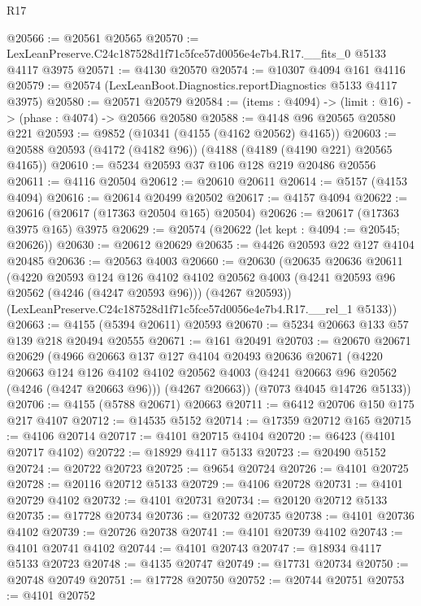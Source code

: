 \begin{lexlean}{R17}
\begin{coremodule}
@20566 := @20561 @20565
@20570 := LexLeanPreserve.C24c187528d1f71c5fce57d0056e4e7b4.R17.__fits_0 @5133 @4117 @3975
@20571 := @4130 @20570
@20574 := @10307 @4094 @161 @4116
@20579 := @20574 (LexLeanBoot.Diagnostics.reportDiagnostics @5133 @4117 @3975)
@20580 := @20571 @20579
@20584 := (items : @4094) -> (limit : @16) -> (phase : @4074) -> @20566 @20580
@20588 := @4148 @96 @20565 @20580 @221
@20593 := @9852 (@10341 (@4155 (@4162 @20562) @4165))
@20603 := @20588 @20593 (@4172 (@4182 @96)) (@4188 (@4189 (@4190 @221) @20565 @4165))
@20610 := @5234 @20593 @37 @106 @128 @219 @20486 @20556
@20611 := @4116 @20504
@20612 := @20610 @20611
@20614 := @5157 (@4153 @4094)
@20616 := @20614 @20499 @20502
@20617 := @4157 @4094
@20622 := @20616 (@20617 (@17363 @20504 @165) @20504)
@20626 := @20617 (@17363 @3975 @165) @3975
@20629 := @20574 (@20622 (let kept : @4094 := @20545; @20626))
@20630 := @20612 @20629
@20635 := @4426 @20593 @22 @127 @4104 @20485
@20636 := @20563 @4003
@20660 := @20630
    (@20635
      @20636
      @20611
      (@4220
        @20593
        @124
        @126
        @4102
        @4102
        @20562
        @4003
        (@4241 @20593 @96 @20562 (@4246 (@4247 @20593 @96)))
        (@4267 @20593))
      (LexLeanPreserve.C24c187528d1f71c5fce57d0056e4e7b4.R17.__rel_1 @5133))
@20663 := @4155 (@5394 @20611) @20593
@20670 := @5234 @20663 @133 @57 @139 @218 @20494 @20555
@20671 := @161 @20491
@20703 := @20670
    @20671
    @20629
    (@4966
      @20663
      @137
      @127
      @4104
      @20493
      @20636
      @20671
      (@4220
        @20663
        @124
        @126
        @4102
        @4102
        @20562
        @4003
        (@4241 @20663 @96 @20562 (@4246 (@4247 @20663 @96)))
        (@4267 @20663))
      (@7073 @4045 @14726 @5133))
@20706 := @4155 (@5788 @20671) @20663
@20711 := @6412 @20706 @150 @175 @217 @4107
@20712 := @14535 @5152
@20714 := @17359 @20712 @165
@20715 := @4106 @20714
@20717 := @4101 @20715 @4104
@20720 := @6423 (@4101 @20717 @4102)
@20722 := @18929 @4117 @5133
@20723 := @20490 @5152
@20724 := @20722 @20723
@20725 := @9654 @20724
@20726 := @4101 @20725
@20728 := @20116 @20712 @5133
@20729 := @4106 @20728
@20731 := @4101 @20729 @4102
@20732 := @4101 @20731
@20734 := @20120 @20712 @5133
@20735 := @17728 @20734
@20736 := @20732 @20735
@20738 := @4101 @20736 @4102
@20739 := @20726 @20738
@20741 := @4101 @20739 @4102
@20743 := @4101 @20741 @4102
@20744 := @4101 @20743
@20747 := @18934 @4117 @5133 @20723
@20748 := @4135 @20747
@20749 := @17731 @20734
@20750 := @20748 @20749
@20751 := @17728 @20750
@20752 := @20744 @20751
@20753 := @4101 @20752

\end{coremodule}
\end{lexlean}
